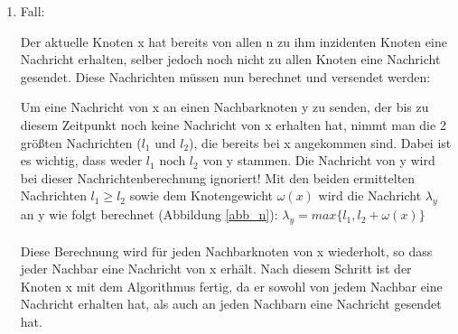 \begin{enumerate}
		
		
	\item Fall:
	
		Der aktuelle Knoten x hat bereits von allen n zu ihm inzidenten Knoten eine Nachricht erhalten, selber jedoch noch nicht zu allen Knoten eine Nachricht gesendet. Diese Nachrichten müssen nun berechnet und versendet werden:\label{labelAufUnterfall}
		
		
			
			
		
		Um eine Nachricht von x an einen Nachbarknoten y zu senden, der bis zu diesem Zeitpunkt noch keine Nachricht von x erhalten hat, nimmt man die 2 größten Nachrichten ($l_{1}$ und $l_{2}$), die bereits bei x angekommen sind. Dabei ist es wichtig, dass weder $l_{1}$ noch $l_{2}$ von y stammen. Die Nachricht von y wird bei dieser Nachrichtenberechnung ignoriert! Mit den beiden ermittelten Nachrichten $l_{1} \ge l_{2}$ sowie dem Knotengewicht $\omega(x)$ wird die Nachricht $\lambda_{y}$ an y wie folgt berechnet (Abbildung \ref{abb_n}):  $\lambda_{y} = max\{l_{1},  l_{2} + \omega(x)\}$
		\\
		\\
		Diese Berechnung wird für jeden Nachbarknoten von x wiederholt, so dass jeder Nachbar eine Nachricht von x erhält. Nach diesem Schritt ist der Knoten x mit dem Algorithmus fertig, da er sowohl von jedem Nachbar eine Nachricht erhalten hat, als auch an jeden Nachbarn eine Nachricht gesendet hat.
		

\end{enumerate}
